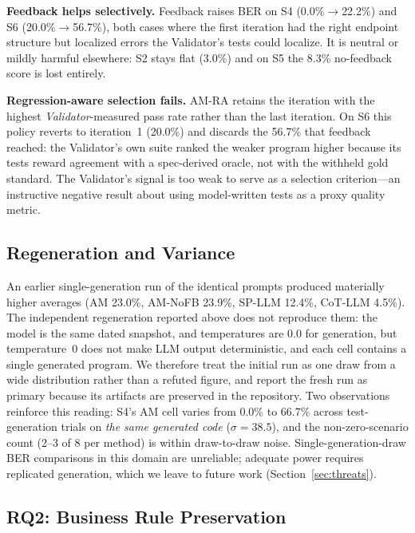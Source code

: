 \documentclass[conference]{IEEEtran}
\begin{document}
\textbf{Feedback helps selectively.} Feedback raises BER on S4 (0.0\%$\rightarrow$22.2\%) and S6 (20.0\%$\rightarrow$56.7\%), both cases where the first iteration had the right endpoint structure but localized errors the Validator's tests could localize. It is neutral or mildly harmful elsewhere: S2 stays flat (3.0\%) and on S5 the 8.3\% no-feedback score is lost entirely.

\textbf{Regression-aware selection fails.} AM-RA retains the iteration with the highest \emph{Validator}-measured pass rate rather than the last iteration. On S6 this policy reverts to iteration~1 (20.0\%) and discards the 56.7\% that feedback reached: the Validator's own suite ranked the weaker program higher because its tests reward agreement with a spec-derived oracle, not with the withheld gold standard. The Validator's signal is too weak to serve as a selection criterion---an instructive negative result about using model-written tests as a proxy quality metric.

\subsection{Regeneration and Variance}
\label{sec:regeneration}

An earlier single-generation run of the identical prompts produced materially higher averages (AM 23.0\%, AM-NoFB 23.9\%, SP-LLM 12.4\%, CoT-LLM 4.5\%). The independent regeneration reported above does not reproduce them: the model is the same dated snapshot, and temperatures are 0.0 for generation, but temperature~0 does not make LLM output deterministic, and each cell contains a single generated program. We therefore treat the initial run as one draw from a wide distribution rather than a refuted figure, and report the fresh run as primary because its artifacts are preserved in the repository. Two observations reinforce this reading: S4's AM cell varies from 0.0\% to 66.7\% across test-generation trials on \emph{the same generated code} ($\sigma=38.5$), and the non-zero-scenario count (2--3 of 8 per method) is within draw-to-draw noise. Single-generation-draw BER comparisons in this domain are unreliable; adequate power requires replicated generation, which we leave to future work (Section~\ref{sec:threats}).

\subsection{RQ2: Business Rule Preservation}
\end{document}
